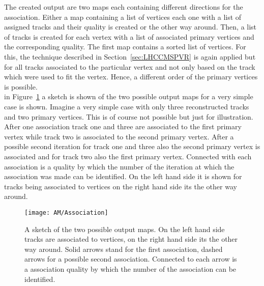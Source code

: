 The created output are two maps each containing different directions for the association. Either a map containing a list of vertices each one with a list of assigned tracks and their quality is created or the other way around. Then, a list of tracks is created for each vertex with a list of associated primary vertices and the corresponding quality. The first map contains a sorted list of vertices. For this, the technique described in Section~\ref{sec:LHCCMSPVR} is again applied but for all tracks associated to the particular vertex and not only based on the track which were used to fit the vertex. Hence, a different order of the primary vertices is possible.\\
in Figure~\ref{plot:AMOutput} a sketch is shown of the two possible output maps for a very simple case is shown. Imagine a very simple case with only three reconstructed tracks and two primary vertices. This is of course not possible but just for illustration. After one association track one and three are associated to the first primary vertex while track two is associated to the second primary vertex. After a possible second iteration for track one and three also the second primary vertex is associated and for track two also the first primary vertex. Connected with each association is a quality by which the number of the iteration at which the association was made can be identified. On the left hand side it is shown for tracks being associated to vertices on the right hand side its the other way around.

\begin{figure}[!ht]
  \centering
  \texttt{[image: AM/Association]}
  \caption[Sketch of the two different output maps]{A sketch of the two possible output maps. On the left hand side tracks are associated to vertices, on the right hand side its the other way around. Solid arrows stand for the first association, dashed arrows for a possible second association. Connected to each arrow is a association quality by which the number of the association can be identified. \label{plot:AMOutput}}
\end{figure}
